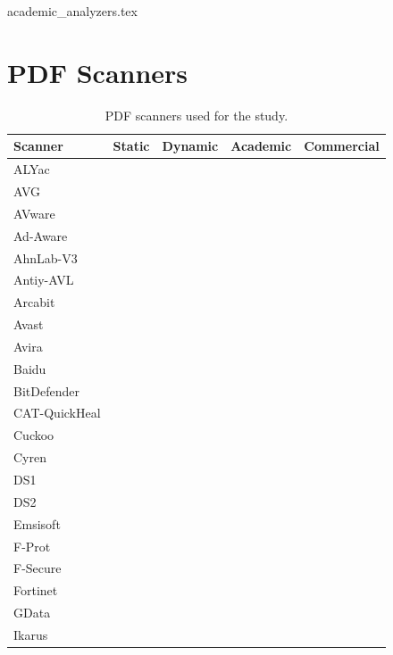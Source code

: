 

\newpage
\appendix
{academic_analyzers.tex}







\section{PDF Scanners}
\label{ss: analyzers}

\begin{table}[tb]
	\caption{PDF scanners used for the study.}
	\label{tab:analyzers}
	\footnotesize
	\setlength{\tabcolsep}{6pt}
    \renewcommand*{\arraystretch}{.6}
	\begin{tabular}{@{}lcccc@{}}
		\toprule
		Scanner & Static & Dynamic & Academic & Commercial \\
		\midrule
		ALYac & \cmark & & & \cmark \\
		AVG & \cmark & & & \cmark \\
		AVware & \cmark & & & \cmark \\
		Ad-Aware & \cmark & & & \cmark \\
		AhnLab-V3 & \cmark & & & \cmark \\
		Antiy-AVL & \cmark & & & \cmark \\
		Arcabit & \cmark & & & \cmark \\
		Avast & \cmark & & & \cmark \\
		Avira & \cmark & & & \cmark \\
		Baidu & \cmark & & & \cmark \\
		BitDefender & \cmark & & & \cmark \\
		CAT-QuickHeal & \cmark & & & \cmark \\
		Cuckoo & & \cmark & \cmark & \cmark \\
		Cyren & \cmark & & & \cmark \\
		DS1 & & \cmark & & \cmark \\%
		DS2 & & \cmark & & \cmark \\%
		Emsisoft & \cmark & & & \cmark \\
		F-Prot & \cmark & & & \cmark \\
		F-Secure & \cmark & & & \cmark \\
		Fortinet & \cmark & & & \cmark \\
		GData & \cmark & & & \cmark \\
		Ikarus & \cmark & & & \cmark \\

\end{tabular}
\end{table}
